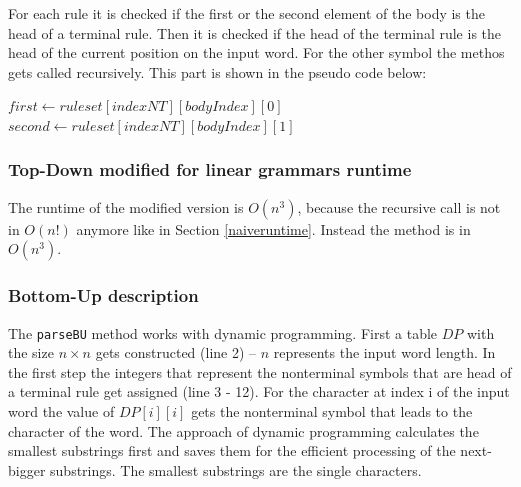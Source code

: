 \documentclass[a4paper, 11pt]{article}
\begin{document}
For each rule it is checked if the first or the second element of the body is the head of a terminal rule. Then it is checked if the head of the terminal rule is the head of the current position on the input word. For the other symbol the methos gets called recursively. This part is shown in the pseudo code below:


\begin{algorithm}[H]
\begin{algorithmic}[1]
\State $first \gets ruleset[indexNT][bodyIndex][0]$
\State $second \gets ruleset[indexNT][bodyIndex][1]$
\EndIf
{}
\EndIf
\EndFor
\end{algorithmic}
\end{algorithm}


\subsubsection{Top-Down modified for linear grammars runtime}
\label{lineartopdown_runtime}

The runtime of the modified version is $O(n^3)$, because the recursive call is not in $O(n!)$ anymore like in Section \ref{naiveruntime}. Instead the method is in $O(n^3)$.




\subsubsection{Bottom-Up description}
\label{bottomupdescription}

The \texttt{parseBU} method works with dynamic programming.
First a table $DP$ with the size $n \times n$ gets constructed (line 2) -- $n$ represents the input word length.
In the first step the integers that represent the nonterminal symbols that are head of a terminal rule get assigned (line 3 - 12). For the character at index i of the input word the value of $DP[i][i]$ gets the nonterminal symbol that leads to the character of the word.
The approach of dynamic programming calculates the smallest substrings first and saves them for the efficient processing of the next-bigger substrings.  The smallest substrings are the single characters.
\end{document}
